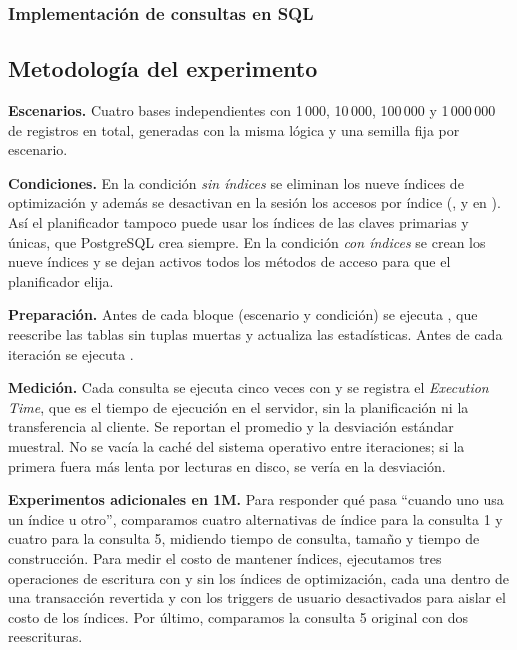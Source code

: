 \subsubsection{Implementación de consultas en SQL}


\subsection{Metodología del experimento}

\textbf{Escenarios.} Cuatro bases independientes con 1\,000, 10\,000, 100\,000 y 1\,000\,000 de registros en total, generadas con la misma lógica y una semilla fija por escenario.

\textbf{Condiciones.} En la condición \emph{sin índices} se eliminan los nueve índices de optimización y además se desactivan en la sesión los accesos por índice (,  y  en ). Así el planificador tampoco puede usar los índices de las claves primarias y únicas, que PostgreSQL crea siempre. En la condición \emph{con índices} se crean los nueve índices y se dejan activos todos los métodos de acceso para que el planificador elija.

\textbf{Preparación.} Antes de cada bloque (escenario y condición) se ejecuta , que reescribe las tablas sin tuplas muertas y actualiza las estadísticas. Antes de cada iteración se ejecuta .

\textbf{Medición.} Cada consulta se ejecuta cinco veces con  y se registra el \emph{Execution Time}, que es el tiempo de ejecución en el servidor, sin la planificación ni la transferencia al cliente. Se reportan el promedio y la desviación estándar muestral. No se vacía la caché del sistema operativo entre iteraciones; si la primera fuera más lenta por lecturas en disco, se vería en la desviación.

\textbf{Experimentos adicionales en 1M.} Para responder qué pasa ``cuando uno usa un índice u otro'', comparamos cuatro alternativas de índice para la consulta 1 y cuatro para la consulta 5, midiendo tiempo de consulta, tamaño y tiempo de construcción. Para medir el costo de mantener índices, ejecutamos tres operaciones de escritura con y sin los índices de optimización, cada una dentro de una transacción revertida y con los triggers de usuario desactivados para aislar el costo de los índices. Por último, comparamos la consulta 5 original con dos reescrituras.

